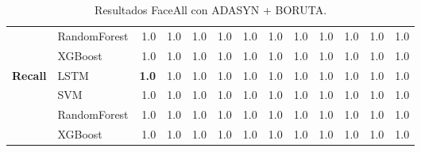 \begin{table}[h]
\begin{adjustbox}{max width=11cm}
\begin{tabular}{|c|l|r|r|r|r|r|r|r|r|r|r|r|}
			& RandomForest &  1.0 &  1.0 &  1.0 &  1.0 &  1.0 &  1.0 &  1.0 &  1.0 &  1.0 &  1.0 &  1.0 \\
			& XGBoost &  1.0 &  1.0 &  1.0 &  1.0 &  1.0 &  1.0 &  1.0 &  1.0 &  1.0 &  1.0 &  1.0 \\
			\hline
			\textbf{Recall} & LSTM &  \textbf{1.0} &  1.0 &  1.0 &  1.0 &  1.0 &  1.0 &  1.0 &  1.0 &  1.0 &  1.0 &  1.0 \\
			& SVM &  1.0 &  1.0 &  1.0 &  1.0 &  1.0 &  1.0 &  1.0 &  1.0 &  1.0 &  1.0 &  1.0 \\
			& RandomForest &  1.0 &  1.0 &  1.0 &  1.0 &  1.0 &  1.0 &  1.0 &  1.0 &  1.0 &  1.0 &  1.0 \\
			& XGBoost &  1.0 &  1.0 &  1.0 &  1.0 &  1.0 &  1.0 &  1.0 &  1.0 &  1.0 &  1.0 &  1.0 \\
			\hline
			
		\end{tabular}
	\end{adjustbox}	
	\caption{Resultados FaceAll con ADASYN + BORUTA.}
	\label{tab:faceAllADASYNBORUTA}
\end{table}

